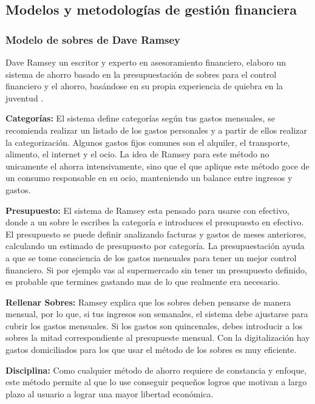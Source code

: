 \subsection{Modelos y metodologías de gestión financiera}
    \subsubsection{Modelo de sobres de Dave Ramsey}
    Dave Ramsey un escritor y experto en asesoramiento financiero, elaboro un sistema de ahorro basado en la presupuestación de sobres para el control financiero y el ahorro, 
    basándose en su propia experiencia de quiebra en la juventud \cite{La Vanguardia}.
    
    \textbf{Categorías:} El sistema define categorías según tus gastos mensuales, se recomienda realizar un listado de los gastos personales y a partir de ellos realizar la 
    categorización. Algunos gastos fijos comunes son el alquiler, el transporte, alimento, el internet y el ocio. La idea de Ramsey para este método no unicamente el ahorra 
    intensivamente, sino que el que aplique este método goce de un consumo responsable en su ocio, manteniendo un balance entre ingresos y gastos. 
    
    \textbf{Presupuesto:} El sistema de Ramsey esta pensado para usarse con efectivo, donde a un sobre le escribes la categoría e introduces el presupuesto en efectivo. El 
    presupuesto se puede definir analizando facturas y gastos de meses anteriores, calculando un estimado de presupuesto por categoría.
    La presupuestación ayuda a que se tome consciencia de los gastos mensuales para tener un mejor control financiero. Si por ejemplo vas al supermercado sin tener un 
    presupuesto definido, es probable que termines gastando mas de lo que realmente era necesario.

    \textbf{Rellenar Sobres:} Ramsey explica que los sobres deben pensarse de manera mensual, por lo que, si tus ingresos son semanales, el sistema debe ajustarse para 
    cubrir los gastos mensuales. Si los gastos son quincenales, debes introducir a los sobres la mitad correspondiente al presupueste mensual. Con la digitalización hay 
    gastos domiciliados para los que usar el método de los sobres es muy eficiente.

    \textbf{Disciplina:} Como cualquier método de ahorro requiere de constancia y enfoque, este método permite al que lo use conseguir pequeños logros que motivan a largo 
    plazo al usuario a lograr una mayor libertad económica.
    
